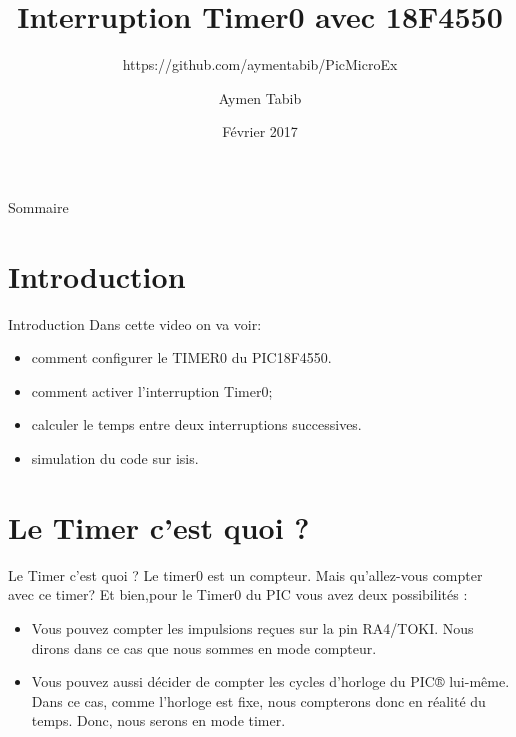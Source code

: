 \documentclass[french]{beamer}
\title{Interruption Timer0 avec 18F4550}
\subtitle{https://github.com/aymentabib/PicMicroEx}
\author[]{Aymen Tabib}
\date{Février 2017}
\institute[DIY]{https://diyelectronique.wordpress.com/}
\newcommand\justifyit{\rightskip0pt \leftskip0pt}
\begin{document}
\begin{frame}
	\titlepage
\end{frame}



\begin{frame}{Sommaire}
	\tableofcontents
\end{frame}

\section{Introduction}
\begin{frame}{Introduction}
\justifyit
Dans cette video on va voir:
\begin{itemize}
\item comment configurer le TIMER0 du PIC18F4550.
\item comment activer l'interruption Timer0;
\item calculer le temps entre deux interruptions successives.
\item simulation du code sur isis.
\end{itemize}


\end{frame}


\section{Le Timer c'est quoi ?}

\begin{frame}{Le Timer c'est quoi ?}
\justifyit
Le timer0 est  un compteur. Mais qu'allez-vous compter avec ce
timer? Et bien,pour le Timer0 du PIC vous avez deux possibilités :

\begin{itemize}

\item Vous pouvez compter les impulsions reçues sur la pin RA4/TOKI.
Nous dirons dans ce cas que nous sommes en mode compteur.
\item Vous pouvez aussi décider de compter les cycles d’horloge du PIC® lui-même.
Dans ce cas, comme l'horloge est fixe, nous compterons donc en réalité du temps.
Donc, nous serons en mode timer.
\end{itemize}
\end{frame}
\end{document}
